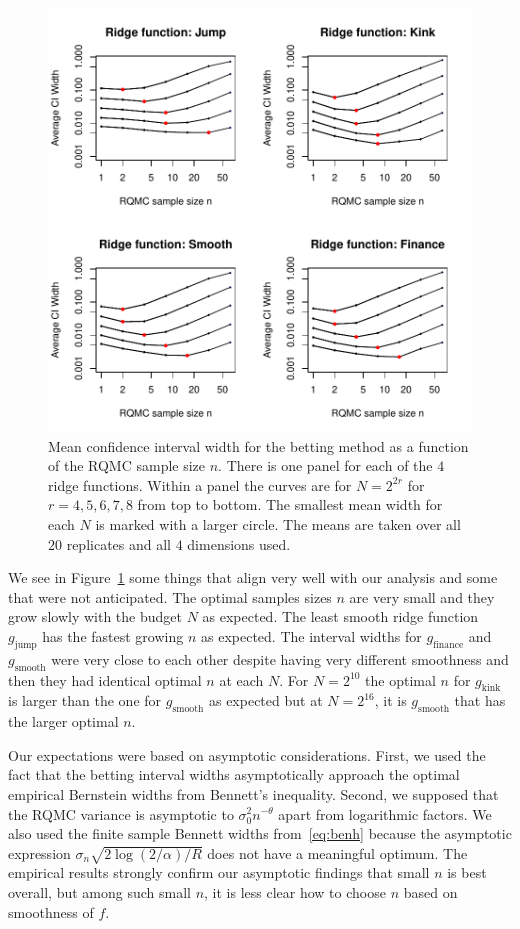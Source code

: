 \documentclass{article}
\newcommand{\art}[1]{\begingroup\color{blue}#1\endgroup}
\newcommand{\jmp}{\mathrm{jump}}
\newcommand{\knk}{\mathrm{kink}}
\newcommand{\smo}{\mathrm{smooth}}
\newcommand{\fin}{\mathrm{finance}}
\begin{document}
\begin{figure}[t]
    \centering
    \includegraphics[width=0.9\linewidth]{figmeanwidths}
    \caption{
Mean confidence interval width for the betting method
as a function of the RQMC sample size $n$.
There is one panel for each of the $4$ ridge functions.
Within a panel the curves are for $N=2^{2r}$
for $r=4,5,6,7,8$ from top to bottom. The smallest
mean width for each $N$ is marked with a larger circle.
The means are taken over all $20$ replicates and
all $4$ dimensions used.
    }
    \label{fig:meanwidths}
\end{figure}

We see in Figure~\ref{fig:meanwidths} some things that
align very well with our analysis and some that
were not anticipated.
The optimal samples sizes $n$ are very small and
they grow slowly with the budget $N$ as expected.
The least smooth ridge function $g_\jmp$ has
the fastest growing $n$ as expected.
The interval widths for $g_\fin$ and $g_\smo$
were very close to each other 
despite having very different smoothness
and then they had identical optimal $n$ at each $N$.
For $N=2^{10}$ the optimal $n$ for $g_\knk$
is larger than the one for $g_\smo$ as expected
but at $N=2^{16}$, it is $g_\smo$ that has
the larger optimal $n$.

Our expectations were based on asymptotic
considerations.
First, we used the fact that the betting interval
widths asymptotically approach the optimal
empirical Bernstein widths from Bennett's
inequality.  Second, we supposed that the RQMC variance
is asymptotic to $\sigma_0^2n^{-\theta}$ apart from logarithmic
factors. We also used the finite sample Bennett
widths from~\eqref{eq:benh} \art{because
the asymptotic expression $\sigma_n\sqrt{2\log(2/\alpha)/R}$
does not have a meaningful optimum.}
The empirical results strongly confirm our
asymptotic findings that small $n$ is best overall,
but among such small $n$, it is less clear
how to choose $n$ based on smoothness of $f$.
\end{document}
